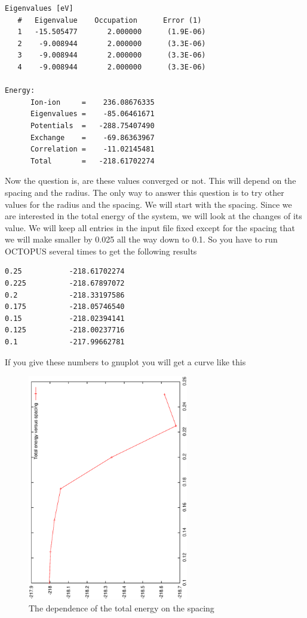 \documentclass{article}
\begin{document}
\begin{verbatim}
Eigenvalues [eV]
   #   Eigenvalue    Occupation      Error (1)
   1   -15.505477       2.000000      (1.9E-06)
   2    -9.008944       2.000000      (3.3E-06)
   3    -9.008944       2.000000      (3.3E-06)
   4    -9.008944       2.000000      (3.3E-06)

Energy:
      Ion-ion     =    236.08676335
      Eigenvalues =    -85.06461671
      Potentials  =   -288.75407490
      Exchange    =    -69.86363967
      Correlation =    -11.02145481
      Total       =   -218.61702274
\end{verbatim}

Now the question is, are these values converged or not. This will depend on the
spacing and the radius. The only way to answer this question is to try other
values for the radius and the spacing. We will start with the spacing. Since we
are interested in the total energy of the system, we will look at the changes of
its value. We will keep all entries in the input file fixed except for the
spacing that we will make smaller by 0.025 all the way down to 0.1. So you have
to run OCTOPUS several times to get the following results

\begin{verbatim}
0.25           -218.61702274
0.225          -218.67897072
0.2            -218.33197586
0.175          -218.05746540
0.15           -218.02394141
0.125          -218.00237716
0.1            -217.99662781
\end{verbatim}

If you give these numbers to gnuplot you will get a curve like this

\begin{figure}[h]
\begin{center}
\includegraphics[width=7cm,angle=-90]{img/spacing.ps}
\end{center}
\caption{The dependence of the total energy on the spacing}
\end{figure}
\end{document}
